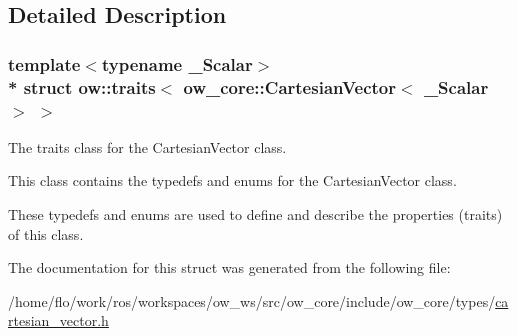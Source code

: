 \subsection{Detailed Description}
\subsubsection*{template$<$typename \+\_\+\+Scalar$>$\\*
struct ow\+::traits$<$ ow\+\_\+core\+::\+Cartesian\+Vector$<$ \+\_\+\+Scalar $>$ $>$}

The traits class for the Cartesian\+Vector class. 

This class contains the typedefs and enums for the Cartesian\+Vector class.

These typedefs and enums are used to define and describe the properties (traits) of this class. 

The documentation for this struct was generated from the following file\+:\begin{DoxyCompactItemize}
\item 
/home/flo/work/ros/workspaces/ow\+\_\+ws/src/ow\+\_\+core/include/ow\+\_\+core/types/\hyperlink{cartesian__vector_8h}{cartesian\+\_\+vector.\+h}\end{DoxyCompactItemize}

